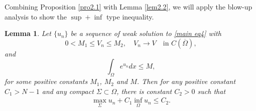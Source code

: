 \documentclass[11pt]{amsart}
\numberwithin{equation}{section}
\newtheorem{lem}[thm]{Lemma}
\begin{document}
Combining Proposition \ref{pro2.1} with Lemma \ref{lem2.2}, we will apply the blow-up analysis to show the $\sup+\inf$ type inequality.
\begin{lem}\label{lem3.1}
Let $\{u_n\}$ be a sequence of weak solution to \eqref{main eq4} with
$$0 < M_1\leq V_{n} \leq M_{2}, \quad V_{n}\rightarrow V \quad\mbox{in }C(\overline{\Omega}),$$
and
$$\int_{\Omega}e^{u_{n}}dx\leq M,$$
for some positive constants $M_{1}$, $M_{2}$ and $M$. Then for any positive constant $C_{1}>N-1$ and any compact $\Sigma\subset\Omega$, there is constant $C_{2}>0$ such that
\begin{align}
\label{sup+inf}\max_{\Sigma}u_{n} +C_{1}\inf_{\Omega}u_{n} \leq C_{2}.\end{align}
\end{lem}
\end{document}

